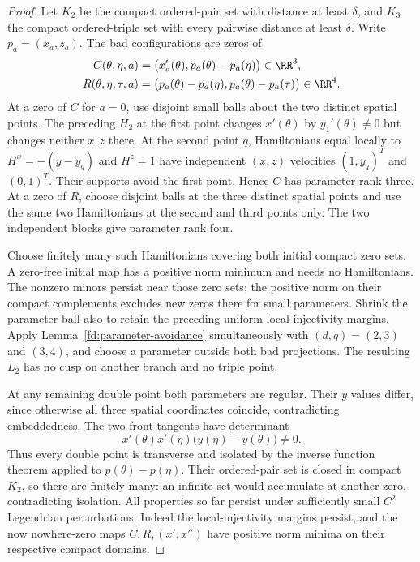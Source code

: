 \begin{proof}
Let $K_2$ be the compact ordered-pair set with distance at least $\delta$,
and $K_3$ the compact ordered-triple set with every pairwise distance at
least $\delta$. Write $p_a=(x_a,z_a)$. The bad configurations are zeros of
\begin{align}
 C(\theta,\eta,a)&=
  \bigl(x_a'(\theta),p_a(\theta)-p_a(\eta)\bigr)\in\RR^3,
 \\
 R(\theta,\eta,\tau,a)&=
  \bigl(p_a(\theta)-p_a(\eta),p_a(\theta)-p_a(\tau)\bigr)\in\RR^4.
\end{align}
At a zero of $C$ for $a=0$, use disjoint small balls about the two
distinct spatial points. The preceding $H_2$ at the first point
changes $x'(\theta)$ by $y_1'(\theta)\ne0$ but changes neither $x,z$
there. At the second point $q$, Hamiltonians equal locally to
$H^x=-(y-y_q)$ and $H^z=1$ have independent $(x,z)$ velocities
$(1,y_q)^T$ and $(0,1)^T$. Their supports avoid the first point.
Hence $C$ has parameter rank three. At a zero of $R$, choose disjoint
balls at the three distinct spatial points and use the same two
Hamiltonians at the second and third points only. The two independent
blocks give parameter rank four.

Choose finitely many such Hamiltonians covering both initial compact
zero sets. A zero-free initial map has a positive norm minimum and
needs no Hamiltonians. The nonzero minors persist near those zero
sets; the positive norm on their compact complements excludes new
zeros there for small parameters. Shrink the parameter ball also to
retain the preceding uniform local-injectivity margins. Apply
Lemma~\ref{fd:parameter-avoidance} simultaneously with $(d,q)=(2,3)$
and $(3,4)$, and choose a parameter outside both bad projections.
The resulting $L_2$ has no cusp on another branch and no triple point.

At any remaining double point both parameters are regular. Their
$y$ values differ, since otherwise all three spatial coordinates
coincide, contradicting embeddedness. The two front tangents have
determinant
\begin{equation}
 x'(\theta)x'(\eta)\bigl(y(\eta)-y(\theta)\bigr)\ne0.
\end{equation}
Thus every double point is transverse and isolated by the inverse
function theorem applied to $p(\theta)-p(\eta)$. Their ordered-pair
set is closed in compact $K_2$, so there are finitely many: an infinite
set would accumulate at another zero, contradicting isolation.
All properties so far persist under sufficiently small $C^2$
Legendrian perturbations. Indeed the local-injectivity margins persist,
and the now nowhere-zero maps $C,R,(x',x'')$ have positive norm minima
on their respective compact domains.


\end{proof}
